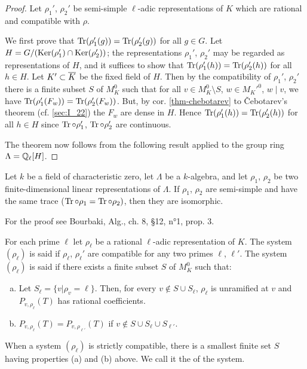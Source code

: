 \begin{proof}
Let $\rho_1'$, $\rho_2'$ be semi-simple $\ell$-adic representations of $K$ 
\dpage
which are rational and compatible with $\rho$.

We first prove that $\operatorname{Tr}(\rho_1'(g)) = \operatorname{Tr}(\rho_2'(g))$ for all $g \in G$. Let $H = G/(\operatorname{Ker}(\rho_1') \cap \operatorname{Ker}(\rho_2'))$; the representations $\rho_1'$, $\rho_2'$ may be regarded as representations of $H$, and it suffices to show that $\operatorname{Tr}(\rho_1'(h)) = \operatorname{Tr}(\rho_2'(h))$ for all $h \in H$. Let $K' \subset \overline{K}$ be the fixed field of $H$. Then by the compatibility of $\rho_1'$, $\rho_2'$ there is a finite subset $S$ of $M_K^0$ such that for all $v \in M_K^0 \setminus S$, $w \in M_K'^0$, $w \mid v$, we have $\operatorname{Tr}(\rho_1'(F_w)) = \operatorname{Tr}(\rho_2'(F_w))$. But, by cor. \ref{thm-chebotarev} to \v{C}ebotarev's theorem (cf. \ref{sec:I_22}) the $F_w$ are dense in $H$. Hence $\operatorname{Tr}(\rho_1'(h)) = \operatorname{Tr}(\rho_2'(h))$ for all $h \in H$ since $\operatorname{Tr} \circ \rho_1'$, $\operatorname{Tr} \circ \rho_2'$ are continuous.

The theorem now follows from the following result applied to the group ring $\Lambda = \mathbb{Q}_{\ell}[H]$.
\end{proof}

\begin{lem}
Let $k$ be a field of characteristic zero, let $\Lambda$ be a $k$-algebra, and let $\rho_1$, $\rho_2$ be two finite-dimensional linear representations of $\Lambda$. If $\rho_1$, $\rho_2$ are semi-simple and have the same trace ($\operatorname{Tr} \circ \rho_1 = \operatorname{Tr} \circ \rho_2)$, then they are isomorphic.
\end{lem}

For the proof see Bourbaki, Alg., ch. 8, \S12, n°1, prop. 3.

\begin{mydef}
For each prime $\ell$ let $\rho_\ell$ be a rational $\ell$-adic representation of $K$. The system $(\rho_\ell)$ is said  if $\rho_\ell$, $\rho_\ell'$ are compatible for any two primes $\ell$, $\ell'$. The system $(\rho_\ell)$ is said  if there exists a finite subset $S$ of $M_K^0$ such that:
\begin{enumerate}[(a)]
	\item Let $S_\ell = \{ v | \rho_v = \ell \}$. Then, for every $v \not\in S \cup S_\ell$, $\rho_\ell$ is unramified at $v$ and $P_{v,\rho_\ell}(T)$ has rational coefficients.
\item $P_{v,\rho_\ell}(T) = P_{v,\rho_{\ell'}}(T)$ if $v \not\in S \cup S_\ell \cup S_{\ell'}$.
\end{enumerate}
\end{mydef}
\dpage
When a system $(\rho_\ell)$ is strictly compatible, there is a smallest finite set $S$ having properties (a) and (b) above. We call it the  of the system.

